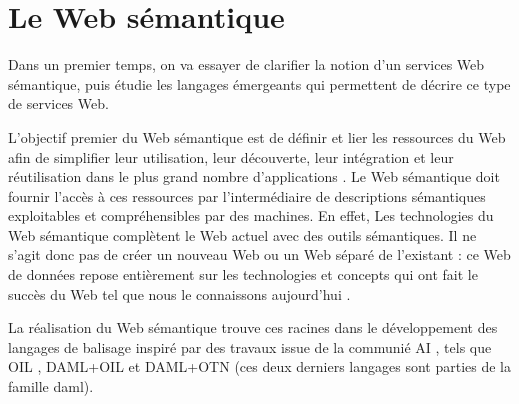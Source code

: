 \chapter{Le Web sémantique}
\label{annexe:semantic-web}





Dans un premier temps, on va essayer de clarifier la notion d'un
services Web sémantique, puis étudie les langages émergeants qui
permettent de décrire ce type de services Web.

L'objectif premier du Web sémantique est de définir et lier les
ressources du Web afin de simplifier leur utilisation, leur
découverte, leur intégration et leur réutilisation dans le plus grand
nombre d'applications \cite{berners2001semantic}. Le Web sémantique
doit fournir l'accès à ces ressources par l'intermédiaire de
descriptions sémantiques exploitables et compréhensibles par des
machines. En effet, Les technologies du Web sémantique complètent le
Web actuel avec des outils sémantiques. Il ne s'agit donc pas de créer
un nouveau Web ou un Web séparé de l'existant : ce Web de données
repose entièrement sur les technologies et concepts qui ont fait le
succès du Web tel que nous le connaissons aujourd'hui
\cite{bertails2010web}.

La réalisation du Web sémantique trouve ces racines dans le
développement des langages de balisage inspiré par des travaux issue
de la communié AI \cite{mcilraith2001semantic}, tels que \textsc{OIL}
\cite{fensel2001oil}, \textsc{DAML+OIL} \cite{horrocks2002daml+oil} et
\textsc{DAML+OTN} \cite{mcguinness2003daml} (ces deux derniers
langages sont parties de la famille \acrshort{daml}).

